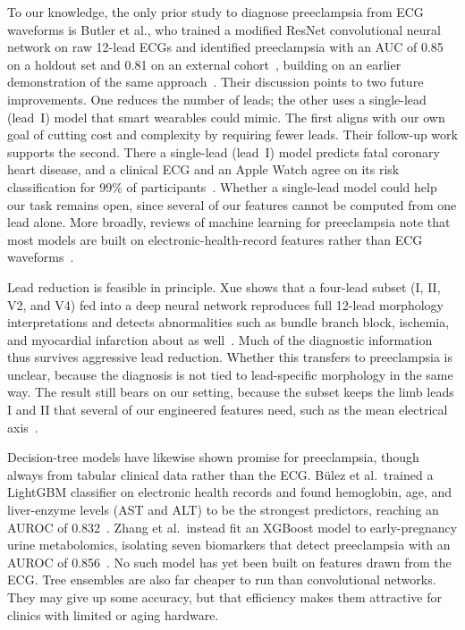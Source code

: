 \documentclass[sigconf,nonacm]{acmart}
\begin{document}
To our knowledge, the only prior study to diagnose preeclampsia from ECG
waveforms is Butler et al., who trained a modified ResNet convolutional
neural network on raw 12-lead ECGs and identified preeclampsia with an
AUC of 0.85 on a holdout set and 0.81 on an external
cohort~\cite{butler_ai-based_2024}, building on an earlier demonstration
of the same approach~\cite{butler_electrocardiographic_2023}. Their
discussion points to two future improvements. One reduces the number of
leads; the other uses a single-lead (lead~I) model that smart wearables could
mimic. The first aligns with our own goal of cutting cost and complexity by
requiring fewer leads. Their follow-up work supports the second. There a
single-lead (lead~I) model predicts fatal coronary heart disease, and a
clinical ECG and an Apple Watch agree on its risk classification for 99\% of
participants~\cite{butler_feasibility_2024}. Whether a single-lead model could help our
task remains open, since several of our features cannot be computed from one
lead alone. More broadly, reviews of machine
learning for preeclampsia note that most models are built on
electronic-health-record features rather than ECG
waveforms~\cite{ozcan_preeclampsia_2025}.

Lead reduction is feasible in principle. Xue shows that a four-lead subset
(I, II, V2, and V4) fed into a deep neural network reproduces full 12-lead
morphology interpretations and detects abnormalities such as bundle branch
block, ischemia, and myocardial infarction about as
well~\cite{xue_does_2024}. Much of the diagnostic information thus survives
aggressive lead reduction. Whether this transfers to preeclampsia is unclear,
because the diagnosis is not tied to lead-specific morphology in the same way.
The result still bears on our setting, because the subset keeps the limb leads
I and II that several of our engineered features need, such as the mean
electrical axis~\cite{noauthor_visualising_nodate}.

Decision-tree models have likewise shown promise for preeclampsia, though
always from tabular clinical data rather than the ECG. Bülez et al.\
trained a LightGBM classifier on electronic health records and found
hemoglobin, age, and liver-enzyme levels (AST and ALT) to be the strongest
predictors, reaching an AUROC of 0.832~\cite{bulez_artificial_2024}. Zhang
et al.\ instead fit an XGBoost model to early-pregnancy urine metabolomics,
isolating seven biomarkers that detect preeclampsia with an AUROC of
0.856~\cite{zhang_development_2023}. No such model has yet been built on
features drawn from the ECG. Tree ensembles are also far cheaper to run
than convolutional networks. They may give up some accuracy, but that
efficiency makes them attractive for clinics with limited or aging hardware.
\end{document}
